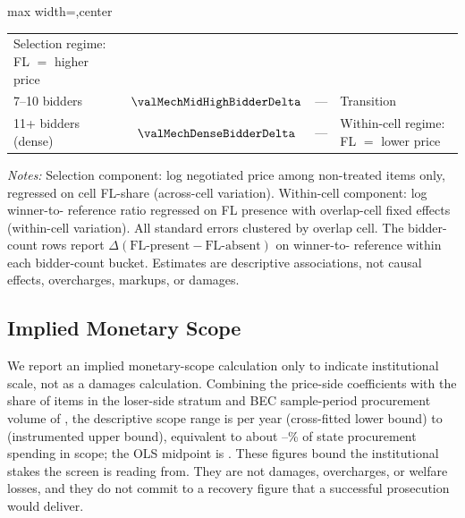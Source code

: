 \begin{table}[htbp]
\begin{adjustbox}{max width=\textwidth,center}
\begin{threeparttable}
\begin{tabular}{p{4.8cm}cp{2.0cm}p{5.6cm}}
  Selection regime: FL $=$ higher price \\
\hspace{6pt} 7--10 bidders & $\valMechMidHighBidderDelta$ & --- &
  Transition \\
\hspace{6pt} 11+ bidders (dense) & $\valMechDenseBidderDelta$ & --- &
  Within-cell regime: FL $=$ lower price \\
\bottomrule
\end{tabular}
\begin{tablenotes}
\footnotesize
\item \textit{Notes:} Selection component: log negotiated price
among non-treated items only, regressed on cell FL-share
(across-cell variation). Within-cell component: log winner-to-
reference ratio regressed on FL presence with overlap-cell fixed
effects (within-cell variation). All standard errors clustered
by overlap cell. The bidder-count rows report
$\Delta(\text{FL-present} - \text{FL-absent})$ on winner-to-
reference within each bidder-count bucket. Estimates are
descriptive associations, not causal effects, overcharges,
markups, or damages.
\end{tablenotes}
\end{threeparttable}
\end{adjustbox}
\end{table}

\subsection{Implied Monetary Scope}
\label{app:monetary_scope_submission}

We report an implied monetary-scope calculation only to indicate
institutional scale, not as a damages calculation. Combining the
price-side coefficients with the share of items in the loser-side
stratum and BEC sample-period procurement volume of
\valWelfareDenom, the descriptive scope range is
\valWelfareCrossfit{} per year (cross-fitted lower bound) to
\valWelfareIV{} (instrumented upper bound), equivalent to about
\valWelfareLowPct{}--\valWelfareHighPct{}\% of state procurement
spending in scope; the OLS midpoint is \valWelfareOLS. These
figures bound the institutional stakes the screen is reading from.
They are not damages, overcharges, or welfare losses, and they do
not commit to a recovery figure that a successful prosecution
would deliver.
